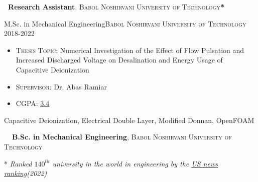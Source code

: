%
%
%

\vspace{10pt}
\begin{scholarship}
          {\textbf{\normalfont{|}\ \textbf{Research Assistant}}, {\textsc{Babol Noshirvani University of Technology\textbf{*}}}}
\end{scholarship}
\vspace{6pt}
\begin{experiences}
  \experience
    {}   {M.Sc. in Mechanical Engineering}{\normalfont\textsc{Babol Noshirvani University of Technology}}{}
    {2018-2022\ \ \ \ } {
          \begin{itemize}
            \item \textsc{Thesis Topic}: {Numerical Investigation of the Effect of Flow Pulsation and Increased Discharged Voltage on Desalination and Energy Usage of Capacitive Deionization}

            \item \textsc{Supervisor}: {Dr. Abas Ramiar}

            \item \textsc{CGPA}: \href{https://gist.github.com/reverseila/24c89dd27e5f34cd16ac5104d5f5842d}{\color{basecolor} 3.4}
            \vspace{3pt}
          \end{itemize}
        }
        {Capacitive Deionization, Electrical Double Layer, Modified Donnan, OpenFOAM}
\end{experiences}

\begin{scholarship}
          {\textbf{\normalfont{|}\ \ \textbf{B.Sc. in Mechanical Engineering}}, \textsc{Babol Noshirvani University of Technology}}
\end{scholarship}
\vspace{5pt}

* \emph{Ranked $140^{th}$ university in the world in engineering by the \href{https://www.usnews.com/education/best-global-universities/engineering}{\color{basecolor}US news ranking}(2022)}


\vspace{10pt}
